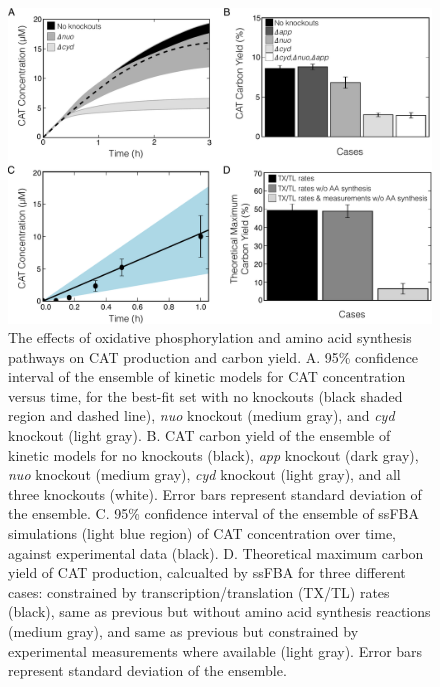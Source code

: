 \documentclass[12pt]{article}
\begin{document}
\begin{figure}[ht]
\centering
\includegraphics[width=1.00\textwidth]{./Figures/oxKO_ssFBA_yields.pdf}
\caption{The effects of oxidative phosphorylation and amino acid synthesis pathways on CAT production and carbon yield. A. 95\% confidence interval of the ensemble of kinetic models for CAT concentration versus time, for the best-fit set with no knockouts (black shaded region and dashed line), \textit{nuo} knockout (medium gray), and \textit{cyd} knockout (light gray). B. CAT carbon yield of the ensemble of kinetic models for no knockouts (black), \textit{app} knockout (dark gray), \textit{nuo} knockout (medium gray), \textit{cyd} knockout (light gray), and all three knockouts (white). Error bars represent standard deviation of the ensemble. C. 95\% confidence interval of the ensemble of ssFBA simulations (light blue region) of CAT concentration over time, against experimental data (black). D. Theoretical maximum carbon yield of CAT production, calcualted by ssFBA for three different cases: constrained by transcription/translation (TX/TL) rates (black), same as previous but without amino acid synthesis reactions (medium gray), and same as previous but constrained by experimental measurements where available (light gray). Error bars represent standard deviation of the ensemble.}
\label{fig:oxKO_ssFBA_yields}
\end{figure}
\clearpage
\end{document}
